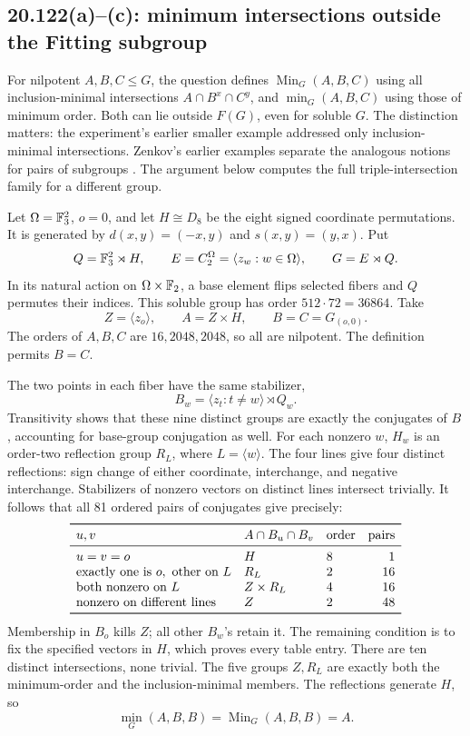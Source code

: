 \subsection{20.122(a)--(c): minimum intersections outside the Fitting subgroup}
\label{cand:20.122}
For nilpotent \(A,B,C\le G\), the question defines
\(\operatorname{Min}_G(A,B,C)\) using all inclusion-minimal
intersections \(A\cap B^x\cap C^y\), and \(\min_G(A,B,C)\) using
those of minimum order. Both can lie outside \(F(G)\), even for soluble
\(G\). The distinction matters: the experiment's earlier smaller
example addressed only inclusion-minimal intersections.
Zenkov's earlier examples separate the analogous notions for pairs
of subgroups \cite{zenkov-intersections}. The argument below
computes the full triple-intersection family for a different group.

Let \(\Omega=\mathbb F_3^2\), \(o=0\), and let \(H\cong D_8\) be the eight
signed coordinate permutations. It is generated by
\(d(x,y)=(-x,y)\) and \(s(x,y)=(y,x)\).
Put
\[
 Q=\mathbb F_3^2\rtimes H,\qquad
 E=C_2^\Omega=\langle z_w:w\in\Omega\rangle,\qquad
 G=E\rtimes Q.
\]
In its natural action on \(\Omega\times\mathbb F_2\), a base element flips
selected fibers and \(Q\) permutes their indices.
This soluble group has order \(512\cdot72=36864\).
Take
\[
 Z=\langle z_o\rangle,\qquad
 A=Z\times H,\qquad B=C=G_{(o,0)}.
\]
The orders of \(A,B,C\) are \(16,2048,2048\), so all are nilpotent.
The definition permits \(B=C\).

The two points in each fiber have the same stabilizer,
\[
 B_w=\langle z_t:t\ne w\rangle\rtimes Q_w.
\]
Transitivity shows that these nine distinct groups are exactly
the conjugates of \(B\), accounting for base-group conjugation as well.
For each nonzero \(w\), \(H_w\) is an order-two reflection group
\(R_L\), where \(L=\langle w\rangle\).
The four lines give four distinct reflections: sign change of either
coordinate, interchange, and negative interchange.
Stabilizers of nonzero vectors on distinct lines intersect trivially.
It follows that all 81 ordered pairs of conjugates give precisely:
\[
\begin{array}{lll r}
\toprule
u,v & A\cap B_u\cap B_v & \text{order}&\text{pairs}\\
\midrule
u=v=o&H&8&1\\
\text{exactly one is }o,\ \text{other on }L&R_L&2&16\\
\text{both nonzero on }L&Z\times R_L&4&16\\
\text{nonzero on different lines}&Z&2&48\\
\bottomrule
\end{array}
\]
Membership in \(B_o\) kills \(Z\); all other \(B_w\)'s retain it.
The remaining condition is to fix the specified vectors in \(H\),
which proves every table entry.
There are ten distinct intersections, none trivial.
The five groups \(Z,R_L\) are exactly both the minimum-order and
the inclusion-minimal members. The reflections generate \(H\), so
\[
 \min_G(A,B,B)=\operatorname{Min}_G(A,B,B)=A.
\]

